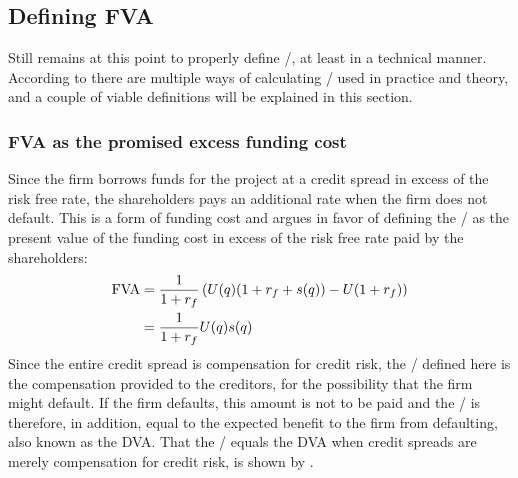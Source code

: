 \documentclass[../main.tex]{subfiles}
\begin{document}
    \subsection{Defining FVA}
        Still remains at this point to properly define \FVA/, at least in a technical manner.
        According to \cite{ADS2019} there are multiple ways of calculating \FVA/ used in practice and theory,
        and a couple of viable definitions will be explained in this section.

        \subsubsection{FVA as the promised excess funding cost}
            Since the firm borrows funds for the project at a credit spread in excess of the risk free rate, 
            the shareholders pays an additional rate when the firm does not default. 
            This is a form of funding cost and argues in favor of defining the \FVA/ as
            the present value of the funding cost in excess of the risk free rate paid by the shareholders:
            \begin{align}
                \FVA/ 
                &= \discountfactor \left(
                    U(q) (1 + \rfrate + s(q))
                    - U (1 + \rfrate)
                \right) 
                \nonumber \\
                &= \discountfactor U(q) s(q)
                \label{eqn:fva-as-promised-excess-funding-cost}
            \end{align}
            Since the entire credit spread is compensation for credit risk,
            the \FVA/ defined here is the compensation provided to the creditors,
            for the possibility that the firm might default. 
            If the firm defaults, this amount is not to be paid and the \FVA/ is therefore, in addition, 
            equal to the expected benefit to the firm from defaulting, also known as the DVA. 
            That the \FVA/ equals the DVA when credit spreads are merely compensation for credit risk, 
            is shown by \cite{HullWhiteFVA}.
\end{document}
